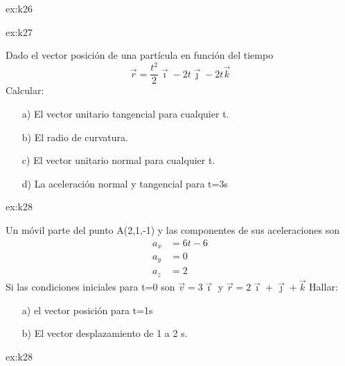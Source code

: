 \begin{multicols}{2}
\begin{excercise}[][][a) $\vec{r}=(3t^2-t +1)\vec{\imath}-2 e^{-3t}\vec{\jmath} + 2\cos (4t)\vec{k}$]{ex:k26}
{\begin{itemize}
        \end{itemize}
         }
    \end{excercise}
    \begin{excercise}[][][a) $\vec{e}_t=\frac{1}{\sqrt{t^2+8}}(t\vec{\imath}+2\vec{\jmath}-2\vec{k})$, b) $\rho=\sqrt{\frac{(t^2+8)^3}{8}}$, c) $\vec{e}_n=\frac{1}{\sqrt{8(t^2+8)}}(8\vec{\imath}-2t\vec{\jmath}+2t\vec{k})$, ]{ex:k27}{
         Dado el vector posición de una partícula en función del tiempo 
            \begin{equation*}
                \vec{r}=\frac{t^2}{2}\vec{\imath}-2t\vec{\jmath}-2t\vec{k}
            \end{equation*}
        Calcular:
            \begin{itemize}
                \item[a)] El vector unitario tangencial para cualquier t.
                \item[b)] El radio de curvatura.
                \item[c)] El vector unitario normal para cualquier t. 
                \item[d)] La aceleración normal y tangencial para t=3s
             \end{itemize}
         }
    \end{excercise}
    \begin{excercise}[][][a),$\vec{r}=-2\vec{\imath}+7\vec{\jmath} + 5\vec{k}$ b) $\Delta\vec{r}=-2\vec{\imath}+3\vec{\jmath} + 3\vec{k}$]{ex:k28}{
         Un móvil parte del punto A(2,1,-1) y las componentes de sus aceleraciones son 
         \begin{align*}
             a_x&=6t-6\\
             a_y&=0\\
             a_z&=2 
         \end{align*}
        Si las condiciones iniciales para t=0 son $\vec{v}=3\vec{\imath}$ y $\vec{r}=2\vec{\imath}+\vec{\jmath}+\vec{k}$ Hallar:
         \begin{itemize}
             \item[a)] el vector posición para t=1s
             \item[b)] El vector desplazamiento  de 1 a 2 s.
         \end{itemize}
         }
    \end{excercise}
    \begin{excercise}[][][a),$a_t=\frac{738}{\sqrt{153}}$ b) $a_n=\frac{108}{\sqrt{153}}$, c) $\rho=17.5$ m]{ex:k28}{
}
\end{excercise}
\end{multicols}

